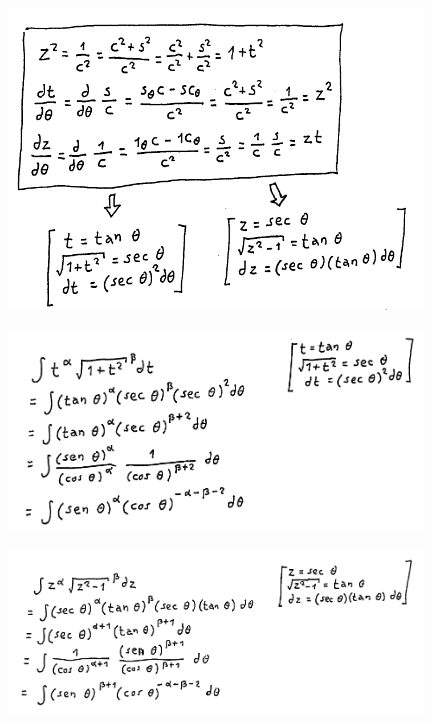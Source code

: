 \documentclass[oneside,12pt]{article}
\begin{document}
\newpage

\includegraphics[height=8cm]{2020-1-C2/20201202_substtrig_ids_e_blocos.pdf}

\newpage

\includegraphics[width=11cm]{2020-1-C2/20201202_substtrig_t.pdf}

\newpage

\includegraphics[width=11cm]{2020-1-C2/20201202_substtrig_z.pdf}



\pu
\end{document}
